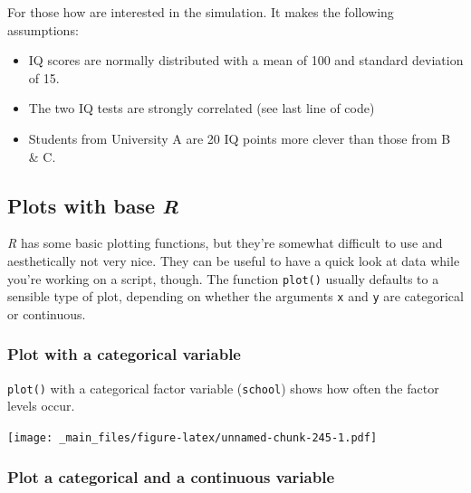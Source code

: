 \documentclass[
]{scrartcl}
\makeatletter
\newenvironment{Shaded}{\begin{snugshade}}{\end{snugshade}}
\newcommand{\DataTypeTok}[1]{\textcolor[rgb]{0.13,0.29,0.53}{#1}}
\newcommand{\KeywordTok}[1]{\textcolor[rgb]{0.13,0.29,0.53}{\textbf{#1}}}
\newcommand{\NormalTok}[1]{#1}
\newcommand{\OperatorTok}[1]{\textcolor[rgb]{0.81,0.36,0.00}{\textbf{#1}}}
\providecommand{\tightlist}{%
  \setlength{\itemsep}{0pt}\setlength{\parskip}{0pt}}
\newenvironment{kframe}{%
\medskip{}
\setlength{\fboxsep}{.8em}
 \def\at@end@of@kframe{}%
 \ifinner\ifhmode%
  \def\at@end@of@kframe{\end{minipage}}%
  \begin{minipage}{\columnwidth}%
 \fi\fi%
 \def\FrameCommand##1{\hskip\@totalleftmargin \hskip-\fboxsep
 \colorbox{shadecolor}{##1}\hskip-\fboxsep
     \hskip-\linewidth \hskip-\@totalleftmargin \hskip\columnwidth}%
 \MakeFramed {\advance\hsize-\width
   \@totalleftmargin\z@ \linewidth\hsize
   \@setminipage}}%
 {\par\unskip\endMakeFramed%
 \at@end@of@kframe}
\newenvironment{rmdblock}[1]
  {
  \begin{itemize}
  \renewcommand{\labelitemi}{
    \raisebox{-.7\height}[0pt][0pt]{
      {\setkeys{Gin}{width=3em,keepaspectratio}\texttt{[image: images/\#1]}}
    }
  }
  \setlength{\fboxsep}{1em}
  \begin{kframe}
  \item
  }
  {
  \end{kframe}
  \end{itemize}
  }
\newenvironment{geek}
    {\begin{rmdblock}{geek}}
    {\end{rmdblock}}
\makeatother
\begin{document}
\begin{geek}
For those how are interested in the simulation. It makes the following
assumptions:

\begin{itemize}
\tightlist
\item
  IQ scores are normally distributed with a mean of 100 and standard
  deviation of 15.
\item
  The two IQ tests are strongly correlated (see last line of code)
\item
  Students from University A are 20 IQ points more clever than those
  from B \& C.
\end{itemize}
\end{geek}

\hypertarget{plots-with-base-r}{%
\subsection{\texorpdfstring{Plots with base \emph{R}}{Plots with base R}}\label{plots-with-base-r}}

\emph{R} has some basic plotting functions, but they're somewhat difficult to use and aesthetically not very nice. They can be useful to have a quick look at data while you're working on a script, though. The function \texttt{plot()} usually defaults to a sensible type of plot, depending on whether the arguments \texttt{x} and \texttt{y} are categorical or continuous.

\hypertarget{plot-with-a-categorical-variable}{%
\subsubsection{Plot with a categorical variable}\label{plot-with-a-categorical-variable}}

\texttt{plot()} with a categorical factor variable (\texttt{school}) shows how often the factor levels occur.

\begin{Shaded}
\end{Shaded}

\texttt{[image: \_main\_files/figure-latex/unnamed-chunk-245-1.pdf]}

\hypertarget{plot-a-categorical-and-a-continuous-variable}{%
\subsubsection{Plot a categorical and a continuous variable}\label{plot-a-categorical-and-a-continuous-variable}}
\end{document}

